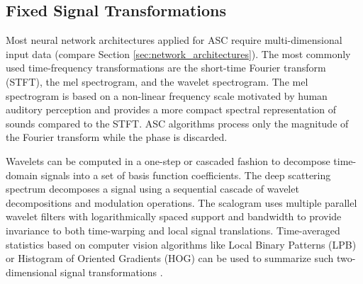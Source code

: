 \documentclass[applsci,article,submit,oneauthor,pdftex]{Definitions/mdpi}
\newcommand{\secref}[1]{{Section \ref{#1}}}
\begin{document}
 



\subsection{Fixed Signal Transformations}

Most neural network architectures applied for ASC require multi-dimensional input data (compare \secref{sec:network_architectures}). 
The most commonly used time-frequency transformations are the short-time Fourier transform (STFT), 
the mel spectrogram, and the wavelet spectrogram.
The mel spectrogram is based on a non-linear frequency scale motivated by human auditory perception and 
provides a more compact spectral representation of sounds compared to the STFT. 
ASC algorithms process only the magnitude of the Fourier transform while the phase is discarded.

Wavelets can be computed in a one-step \citep{Qian:2017:WaveletASC:DCASE, Ren:2017:DeepSequentialASC:DCASE} or cascaded fashion \citep{Li:2019:MultilevelAttention:ICMEW} to decompose time-domain signals into a set of basis function coefficients.
The deep scattering spectrum \citep{Li:2019:MultilevelAttention:ICMEW} decomposes a signal using a sequential cascade of wavelet decompositions and modulation operations.
The scalogram \citep{Chen:2018:Scalogram:INTERSPEECH, Chen:2019:ASC:DCASE} uses multiple parallel wavelet filters with  logarithmically spaced support and bandwidth to provide invariance to both time-warping and local signal translations.
Time-averaged statistics based on computer vision algorithms like Local Binary Patterns (LPB) or Histogram of Oriented Gradients (HOG) can be used to summarize such two-dimensional signal transformations \citep{Ye:2018:ASC:AS}.
\end{document}
